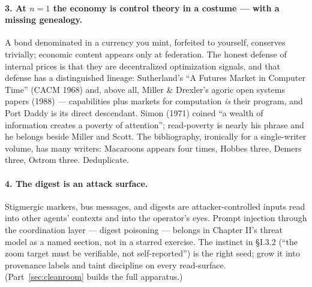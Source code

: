 \documentclass[11pt,a4paper]{article}
\theoremstyle{definition}
\theoremstyle{remark}
\begin{document}
\paragraph{3. At $n{=}1$ the economy is control theory in a costume --- with a missing genealogy.} A bond denominated in a currency you mint, forfeited to yourself, conserves trivially; economic content appears only at federation. The honest defense of internal prices is that they are decentralized optimization signals, and that defense has a distinguished lineage: Sutherland's ``A Futures Market in Computer Time'' (CACM 1968) and, above all, Miller \& Drexler's agoric open systems papers (1988) --- capabilities plus markets for computation \emph{is} their program, and Port Daddy is its direct descendant. Simon (1971) coined ``a wealth of information creates a poverty of attention''; read-poverty is nearly his phrase and he belongs beside Miller and Scott. The bibliography, ironically for a single-writer volume, has many writers: Macaroons appears four times, Hobbes three, Demers three, Ostrom three. Deduplicate.

\paragraph{4. The digest is an attack surface.} Stigmergic markers, bus messages, and digests are attacker-controlled inputs read into other agents' contexts and into the operator's eyes. Prompt injection through the coordination layer --- digest poisoning --- belongs in Chapter II's threat model as a named section, not in a starred exercise. The instinct in \S I.3.2 (``the zoom target must be verifiable, not self-reported'') is the right seed; grow it into provenance labels and taint discipline on every read-surface. (Part~\ref{sec:cleanroom} builds the full apparatus.)
\end{document}
